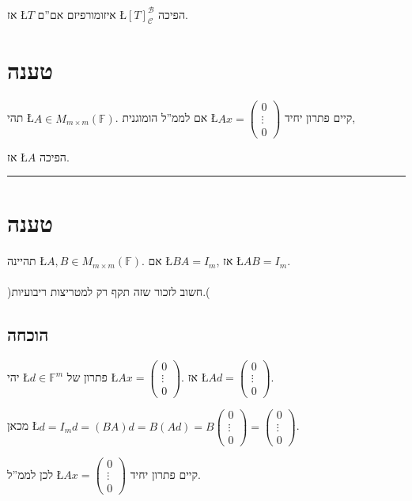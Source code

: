 \documentclass[english,hebrew]{article}
\begin{document}
אז \L{$T$} איזומורפיזם אם\textquotedblright ם \L{$[T]_{\mathcal{C}}^{\mathcal{B}}$}
הפיכה.

\section{טענה {\endL}}

תהי \L{$A\in M_{m\times m}(\mathbb{F})$}. אם לממ\textquotedblright ל
הומוגנית \L{$Ax=\begin{pmatrix}0\\
\vdots\\
0
\end{pmatrix}$} קיים פתרון יחיד,

אז \L{$A$} הפיכה.\\

\rule[0.5ex]{1\columnwidth}{1pt}

\section{טענה}

תהיינה \L{$A,B\in M_{m\times m}(\mathbb{F})$}. אם \L{$BA=I_{m}$},
אז \L{$AB=I_{m}$}.\\
\\
)חשוב לזכור שזה תקף רק למטריצות ריבועיות.(

\subsection{הוכחה}

יהי \L{$d\in\mathbb{F}^{m}$} פתרון של \L{$Ax=\begin{pmatrix}0\\
\vdots\\
0
\end{pmatrix}$}. אז \L{$Ad=\begin{pmatrix}0\\
\vdots\\
0
\end{pmatrix}$}.

מכאן \L{$d=I_{m}d=(BA)d=B(Ad)=B\begin{pmatrix}0\\
\vdots\\
0
\end{pmatrix}=\begin{pmatrix}0\\
\vdots\\
0
\end{pmatrix}$}.

לכן לממ\textquotedblright ל \L{$Ax=\begin{pmatrix}0\\
\vdots\\
0
\end{pmatrix}$} קיים פתרון יחיד.
\end{document}

